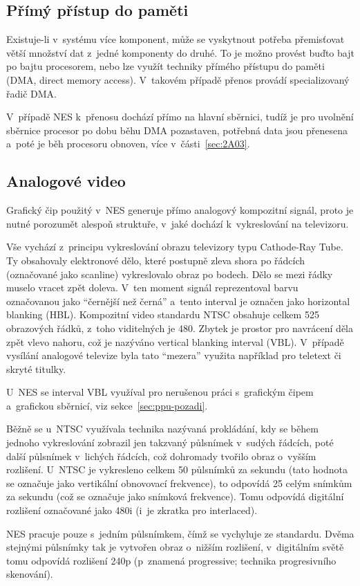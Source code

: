 \subsection{Přímý přístup do paměti}
Existuje-li v~systému více komponent, může se vyskytnout potřeba přemisťovat větší množství dat z~jedné komponenty do druhé.  To je možno provést buďto bajt po bajtu procesorem, nebo lze využít techniky přímého přístupu do paměti (DMA, direct memory access). V~takovém případě přenos provádí specializovaný řadič DMA.~\cite{mos:hw-manual}

V~případě NES k~přenosu dochází přímo na hlavní sběrnici, tudíž je pro uvolnění sběrnice procesor po dobu běhu DMA pozastaven, potřebná data jsou přenesena a~poté je běh procesoru obnoven, více v~části~\ref{sec:2A03}.

\subsection{Analogové video}
\label{sec:analogove-video}
Grafický čip použitý v~NES generuje přímo analogový kompozitní signál, proto je nutné porozumět alespoň struktuře, v~jaké dochází k~vykreslování na televizoru.

Vše vychází z~principu vykreslování obrazu televizory typu Cathode-Ray Tube. Ty obsahovaly elektronové dělo, které postupně zleva shora po řádcích (označované jako scanline) vykreslovalo obraz po bodech. Dělo se mezi řádky muselo vracet zpět doleva. V~ten moment signál reprezentoval barvu označovanou jako \enquote{černější než černá} a~tento interval je označen jako horizontal blanking (HBL). Kompozitní video standardu NTSC obsahuje celkem 525 obrazových řádků, z~toho viditelných je 480. Zbytek je prostor pro navrácení děla zpět vlevo nahoru, což je nazýváno vertical blanking interval (VBL). V~případě vysílání analogové televize byla tato \enquote{mezera} využita například pro teletext či skryté titulky.~\cite{Poynton2012:video}

U~NES se interval VBL využíval pro nerušenou práci s~grafickým čipem a~grafickou sběrnicí, viz sekce~\ref{sec:ppu-pozadi}.

\begin{note}
Běžně se u~NTSC využívala technika nazývaná prokládání, kdy se během jednoho vykreslování zobrazil jen takzvaný půlsnímek v~sudých řádcích, poté další půlsnímek v~lichých řádcích, což dohromady tvořilo obraz o~vyšším rozlišení. U~NTSC je vykresleno celkem 50 půlsnímků za sekundu (tato hodnota se označuje jako vertikální obnovovací frekvence), to odpovídá 25 celým snímkům za sekundu (což se označuje jako snímková frekvence). Tomu odpovídá digitální rozlišení označované jako 480i (i~je zkratka pro interlaced).~

NES pracuje pouze s~jedním půlsnímkem, čímž se vychyluje ze standardu. Dvěma stejnými půlsnímky tak je vytvořen obraz o~nižším rozlišení, v~digitálním světě tomu odpovídá rozlišení 240p (p~znamená progressive; technika progresivního skenování).~
\end{note}

